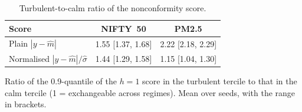 \begin{table}[!t]\centering\caption{Turbulent-to-calm ratio of the nonconformity score.}\label{tab:mechanism}
\scriptsize\begin{tabular}{lcc}\toprule Score & NIFTY~50 & PM2.5\\\midrule
Plain $|y-\hat m|$ & 1.55 [1.37, 1.68] & 2.22 [2.18, 2.29]\\
Normalised $|y-\hat m|/\hat\sigma$ & 1.44 [1.29, 1.58] & 1.15 [1.04, 1.30]\\
\bottomrule\end{tabular}
\par\smallskip\parbox{\linewidth}{\scriptsize Ratio of the 0.9-quantile of the $h=1$ score in the turbulent tercile to that in the calm tercile (1 = exchangeable across regimes). Mean over seeds, with the range in brackets.}
\end{table}